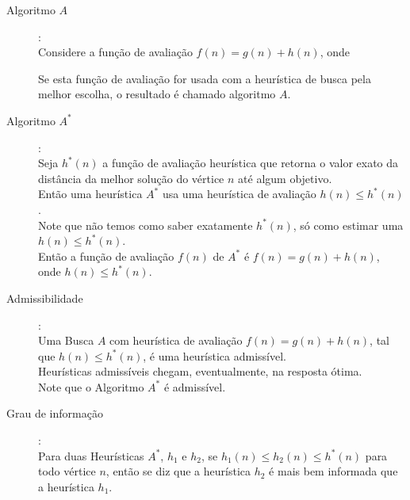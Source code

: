 \documentclass[12pt]{exam}
\begin{document}
\begin{description}

\item[Algoritmo $A$]:\\
Considere a função de avaliação $f(n) = g(n) + h(n)$, onde
Se esta função de avaliação for usada com a heurística de busca pela melhor escolha, o resultado é chamado algoritmo $A$.

\item[Algoritmo $A^*$]:\\
Seja $h^*(n)$ a função de avaliação heurística que retorna o valor exato da distância da melhor solução do vértice $n$ até algum objetivo.\\
Então uma heurística $A^*$ usa uma heurística de avaliação $h(n)\leq h^*(n)$.\\
Note que não temos como saber exatamente $h^*(n)$, só como estimar uma $h(n)\leq h^*(n)$.\\
Então a função de avaliação $f(n)$ de $A^*$ é $f(n) = g(n) + h(n)$, onde $h(n)\leq h^*(n)$.\\

\item[Admissibilidade]:\\
Uma Busca $A$ com heurística de avaliação $f(n) = g(n) + h(n)$, tal que $h(n)\leq h^*(n)$, é uma heurística admissível.\\
Heurísticas admissíveis chegam, eventualmente, na resposta ótima.\\
Note que o Algoritmo $A^*$ é admissível.\\

%

\item[Grau de informação]:\\
Para duas Heurísticas $A^*$, $h_1$ e $h_2$, se $h_1(n)\leq h_2(n)\leq h^*(n)$ para todo vértice $n$, então se diz que a heurística $h_2$ é mais bem informada que a heurística $h_1$.

\end{description}
\end{document}
